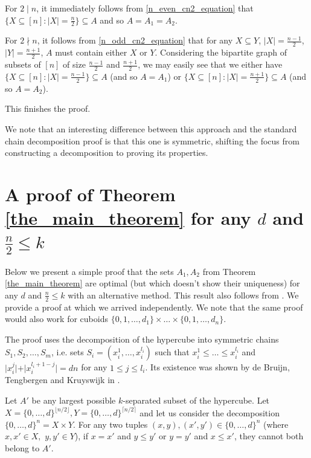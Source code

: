 \documentclass[11pt, reqno]{amsart}
\newcommand{\leanblueprintbase}{https://mj141592.github.io/weighted-chains-paper}
\newif\ifleanlinks
\newcommand{\leanblueprint}[1]{%
  \ifleanlinks
    \leavevmode\unskip\penalty9999\hbox{}\nobreak\hfill\quad
    \href{\leanblueprintbase/theorems/#1/}{%
      \mbox{\normalfont\footnotesize\textcolor{blue}{[\textsf{Lean formalisation}]}}}%
    \par\nobreak
  \fi
}
\theoremstyle{remark}
\numberwithin{equation}{section}
\begin{document}
For $2 \mid n$, it immediately follows from \ref{n_even_cn2_equation} that $\{X \subseteq [n]: \vert X\vert  = \frac{n}{2}\} \subseteq A$ and so $A=A_1=A_2$.

For $2 \nmid n$, it follows from \ref{n_odd_cn2_equation} that for any $X \subseteq Y$, $\vert X\vert =\frac{n-1}{2}$, $\vert Y\vert =\frac{n+1}{2}$, $A$ must contain either $X$ or $Y$. Considering the bipartite graph of subsets of $[n]$ of size $\frac{n-1}{2}$ and $\frac{n+1}{2}$, we may easily see that we either have $\{X \subseteq [n]: \vert X\vert  = \frac{n-1}{2}\} \subseteq A$ (and so $A=A_1$) or $\{X \subseteq [n]: \vert X\vert  = \frac{n+1}{2}\} \subseteq A$ (and so $A=A_2$).

This finishes the proof.

We note that an interesting difference between this approach and the standard chain decomposition proof is that this one is symmetric, shifting the focus from constructing a decomposition to proving its properties.

\section{A proof of Theorem \ref{the_main_theorem} for any \texorpdfstring{$d$}{d} and \texorpdfstring{$\frac{n}{2} \leqslant k$}{n/2 <= k}}
\label{appendix_large_k}

Below we present a simple proof that the sets $A_1, A_2$ from Theorem \ref{the_main_theorem} are optimal (but which doesn't show their uniqueness) for any $d$ and $\frac{n}{2} \leqslant k$ with an alternative method. This result also follows from \cite[Theorem 5.1]{tour_m_part_p_sperner_families}. We provide a proof at which we arrived independently. We note that the same proof would also work for cuboids $\{0, 1, \ldots, d_1\} \times \ldots \times \{0, 1, \ldots, d_n\}$.
\leanblueprint{large-k-appendix}

The proof uses the decomposition of the hypercube into symmetric chains $S_1, S_2, \ldots, S_m$, i.e. sets $S_i=(x_i^1, \ldots, x_i^{l_i})$ such that $x_i^1 \leqslant \ldots \leqslant x_i^{l_i}$ and $\vert x_i^j\vert +\vert x_i^{l_i+1-j}\vert =dn$ for any $1 \leqslant j \leqslant l_i$. Its existence was shown by de Bruijn, Tengbergen and Kruyswijk in \cite{symmetric_chain_decomposition}.

Let $A'$ be any largest possible $k$-separated subset of the hypercube. Let $X=\{0, \ldots, d\}^{\lfloor n/2 \rfloor}, Y=\{0, \ldots, d\}^{\lceil n/2 \rceil}$ and let us consider the decomposition $\{0, \ldots, d\}^n=X \times Y$. For any two tuples $(x, y), (x', y') \in \{0, \ldots, d\}^n$ (where $x, x' \in X,$ $y, y' \in Y$), if $x=x'$ and $y \leqslant y'$ or $y=y'$ and $x \leqslant x'$, they cannot both belong to $A'$.
\end{document}
